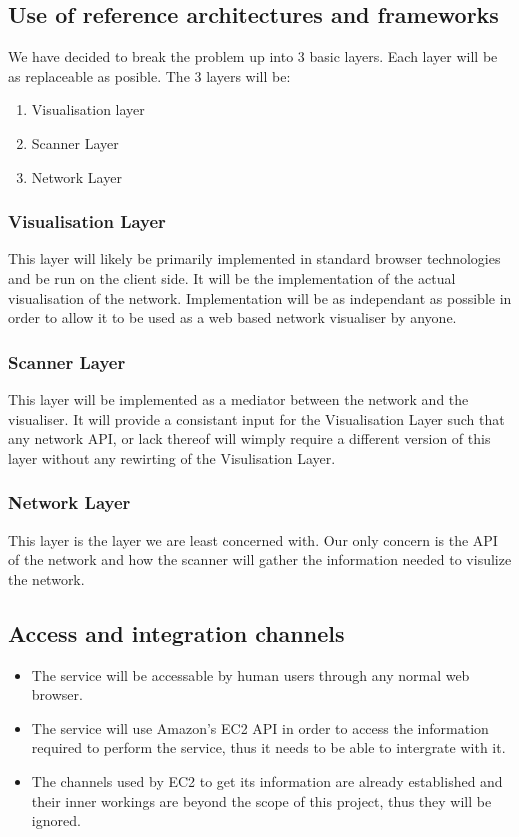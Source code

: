 \documentclass[a4paper,12pt]{report}
\begin{document}
	
		
\subsection{Use of reference architectures and frameworks}
		We have decided to break the problem up into 3 basic layers. Each layer will be as replaceable as posible. The 3 layers will be:
		\begin{enumerate}
			\item Visualisation layer
			\item Scanner Layer
			\item Network Layer
		\end{enumerate}
		\subsubsection{Visualisation Layer}
			This layer will likely be primarily implemented in standard browser technologies and be run on the client side. It will be the implementation of the actual visualisation of the network. Implementation will be as independant as possible in order to allow it to be used as a web based network visualiser by anyone.
		\subsubsection{Scanner Layer}
			This layer will be implemented as a mediator between the network and the visualiser. It will provide a consistant input for the Visualisation Layer such that any network API, or lack thereof will wimply require a different version of this layer without any rewirting of the Visulisation Layer.
		\subsubsection{Network Layer}
			This layer is the layer we are least concerned with. Our only concern is the API of the network and how the scanner will gather the information needed to visulize the network.
	\subsection{Access and integration channels}
		\begin{itemize}
			\item The service will be accessable by human users through any normal web browser.
			\item The service will use Amazon's EC2 API in order to access the information required to perform the service, thus it needs to be able to intergrate with it.
			\item The channels used by EC2 to get its information are already established and their inner workings are beyond the scope of this project, thus they will be ignored.
		\end{itemize}
\end{document}
